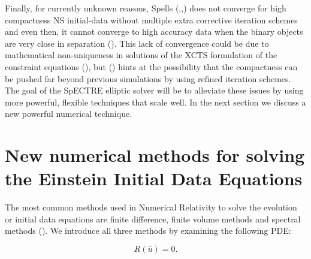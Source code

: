 Finally, for currently unknown reasons, Spells (\cite{pfeiffer2003multidomain},\cite{foucart2008initial},\cite{henriksson2014initial}) does not converge for high compactness NS initial-data without multiple extra corrective iteration schemes and even then, it cannot converge to high accuracy data when the binary objects are very close in separation (\cite{henriksson2014initial}). This lack of convergence could be due to mathematical non-uniqueness in solutions of the XCTS formulation of the constraint equations (\cite{cordero2009improved}), but (\cite{henriksson2014initial}) hints at the possibility that the compactness can be pushed far beyond previous simulations by using refined iteration schemes. The goal of the SpECTRE elliptic solver will be to alleviate these issues by using more powerful, flexible techniques that scale well. In the next section we discuss a new powerful numerical technique.

\section{New numerical methods for solving the Einstein Initial Data Equations}

The most common methods used in Numerical Relativity to solve the evolution or initial data equations are finite difference, finite volume methods and spectral methods (\cite{baumgarte2010numerical}). We introduce all three methods by examining the following PDE:

\begin{equation}
  \label{eqn:residual}
 R(\bar u) = 0.
\end{equation}

